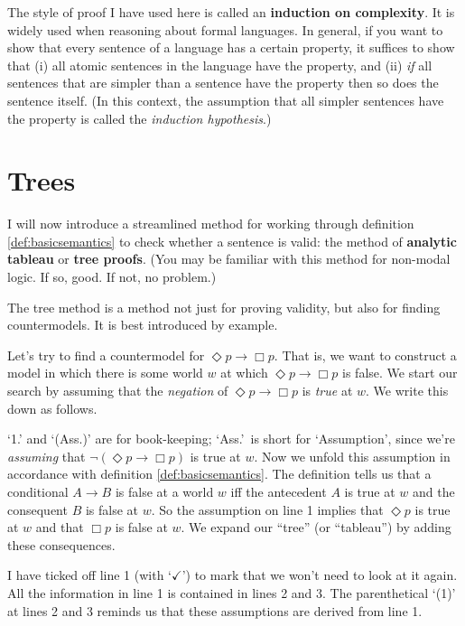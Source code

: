 The style of proof I have used here is called an \textbf{induction on
  complexity}. It is widely used when reasoning about formal languages. In
general, if you want to show that every sentence of a language has a certain
property, it suffices to show that (i) all atomic sentences in the language have
the property, and (ii) \emph{if} all sentences that are simpler than a sentence
have the property then so does the sentence itself. (In this context, the
assumption that all simpler sentences have the property is called the
\emph{induction hypothesis}.)


\section{Trees}\label{sec:trees}

I will now introduce a streamlined method for working through definition
\ref{def:basicsemantics} to check whether a sentence is valid: the method of
\textbf{analytic tableau} or \textbf{tree proofs}. (You may be familiar with
this method for non-modal logic. If so, good. If not, no problem.)

The tree method is a method not just for proving validity, but also for finding
countermodels. It is best introduced by example.

Let's try to find a countermodel for $\Diamond p \to \Box p$. That is, we want
to construct a model in which there is some world $w$ at which
$\Diamond p\to \Box p$ is false. We start our search by assuming that the
\emph{negation} of $\Diamond p \to \Box p$ is \emph{true} at $w$. We write this
down as follows.

\begin{center}
\end{center}
%
`1.' and `(Ass.)' are for book-keeping; `Ass.'\ is short for `Assumption', since
we're \emph{assuming} that $\neg(\Diamond p \to \Box p)$ is true at $w$. Now we
unfold this assumption in accordance with definition \ref{def:basicsemantics}.
The definition tells us that a conditional $A\to B$ is false at a world $w$ iff
the antecedent $A$ is true at $w$ and the consequent $B$ is false at $w$. So the
assumption on line 1 implies that $\Diamond p$ is true at $w$ and that $\Box p$
is false at $w$. We expand our ``tree'' (or ``tableau'') by adding these consequences.

\begin{center}
\end{center}
%
I have ticked off line 1 (with `$\checkmark$') to mark that we won't need to
look at it again. All the information in line 1 is contained in lines 2 and 3.
The parenthetical `(1)' at lines 2 and 3 reminds us that these assumptions are
derived from line 1.

